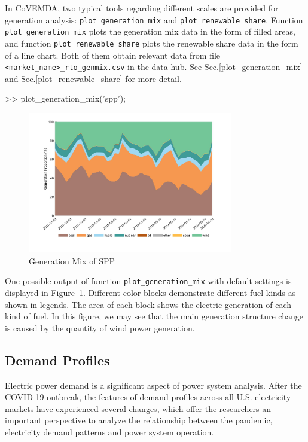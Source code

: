 \documentclass[10pt]{article}
\newcommand{\covemda}{CoVEMDA}
\numberwithin{equation}{section}
\numberwithin{table}{section}
\numberwithin{figure}{section}
\begin{document}
In \covemda{}, two typical tools regarding different scales are provided for generation analysis: \verb!plot_generation_mix! and \verb!plot_renewable_share!. Function \verb!plot_generation_mix! plots the generation mix data in the form of filled areas, and function \verb!plot_renewable_share! plots the renewable share data in the form of a line chart. Both of them obtain relevant data from file \verb!<market_name>_rto_genmix.csv! in the data hub. See Sec.\ref{plot_generation_mix} and Sec.\ref{plot_renewable_share} for more detail.

\begin{Code}
>> plot_generation_mix('spp');
\end{Code}

\begin{figure}
  \centering
  \noindent\includegraphics[width=0.8\textwidth]{figures/visualization_plot_generation_mix.jpg}
  \caption{Generation Mix of SPP} \label{fig:vis_1}
\end{figure}

One possible output of function \verb!plot_generation_mix! with default settings is displayed in Figure~\ref{fig:vis_1}. Different color blocks demonstrate different fuel kinds as shown in legends. The area of each block shows the electric generation of each kind of fuel. In this figure, we may see that the main generation structure change is caused by the quantity of wind power generation.



\subsection{Demand Profiles}

Electric power demand is a significant aspect of power system analysis. After the COVID-19 outbreak, the features of demand profiles across all U.S. electricity markets have experienced several changes, which offer the researchers an important perspective to analyze the relationship between the pandemic, electricity demand patterns and power system operation.
\end{document}
